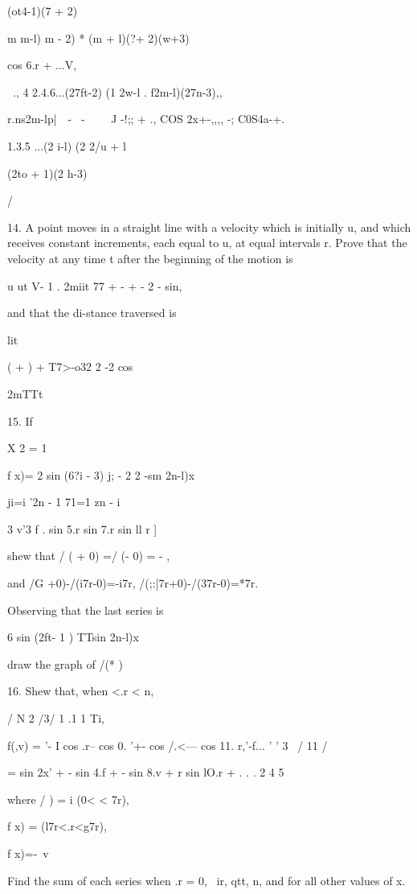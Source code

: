 {(ot4-1)(7 + 2)

m m-l) m - 2) * (m + l)(?\pi + 2)(w+3)

cos 6.r + ...V,

  \ ., 4 2.4.6...(27ft-2) (1 2w-l . f2m-l)(27n-3),,

r.ns2m-l\;p|\ \ - \ - \ \ \ \ J -!;; + ., COS 2x+-,,,, -;
C0S4a-+.

1.3.5 ...(2 i-l) (2 2/u + l

(2to + 1)(2 h-3)

/

14. A point moves in a straight line with a velocity which is
initially u, and which receives constant increments, each equal to u,
at equal intervals r. Prove that the velocity at any time t after the
beginning of the motion is

u ut V- 1 . 2miit 77 + - + - 2 - sin,

and that the di-stance traversed is

lit

( + ) + T7>-o32 2 -2 cos

2mTTt


%
%

15. If

X 2 = 1

f x)= 2 sin (6?i - 3) j; - 2 2 -sm 2n-l)x

ji=i '2n - 1 71=1 zn - i

3 v'3 f . sin 5.r sin 7.r sin ll r ]

shew that / ( + 0) =/ (\pi - 0) = - \pi,

and /G +0)-/(i7r-0)=-i7r, /(;:|7r+0)-/(37r-0)=*7r.

Observing that the last series is

6 sin (2ft- 1 ) TTsin 2n-l)x

draw the graph of /(* ) 

16. Shew that, when <.r < n,

 / N 2 /3/ 1 .1 1 Ti, \

f(,v) = '- I cos .r-- cos 0. '+- cos /.<--- cos 11. r,'-f... ' ' 3 \
/ 11 /

= sin 2x' + - sin 4.f + - sin 8.v + r sin lO.r + . . . 2 4 5

where / ) = i (0< < 7r),

f x) = (l7r<.r<g7r),

f x)=-\ v %

Find the sum of each series when .r = 0, \ ir, qtt, n, and for all
other values of x.

}
